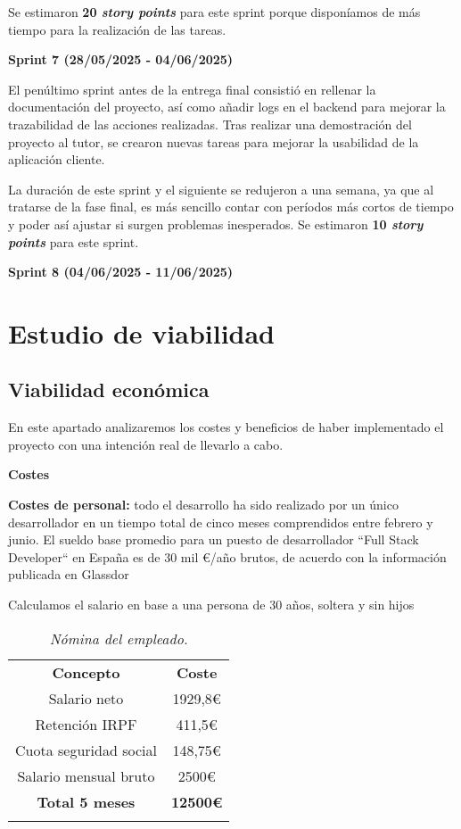 Se estimaron \textbf{20 \textit{story points}} para este sprint porque disponíamos de más tiempo para la realización de las
tareas.

\textbf{Sprint 7 (28/05/2025 - 04/06/2025)}

El penúltimo sprint antes de la entrega final consistió en rellenar la documentación del proyecto, así como añadir
logs en el backend para mejorar la trazabilidad de las acciones realizadas.
Tras realizar una demostración del proyecto al tutor, se crearon nuevas tareas para mejorar la usabilidad de la
aplicación cliente.

La duración de este sprint y el siguiente se redujeron a una semana, ya que al tratarse de la fase final, es más sencillo
contar con períodos más cortos de tiempo y poder así ajustar si surgen problemas inesperados.
Se estimaron \textbf{10 \textit{story points}} para este sprint.

\textbf{Sprint 8 (04/06/2025 - 11/06/2025)}

\section{Estudio de viabilidad}

\subsection{Viabilidad económica}

En este apartado analizaremos los costes y beneficios de haber implementado el proyecto con una intención real de llevarlo
a cabo.

\textbf{Costes}

\textbf{Costes de personal:} todo el desarrollo ha sido realizado por un único desarrollador en un tiempo total de cinco
meses comprendidos entre febrero y junio.
El sueldo base promedio para un puesto de desarrollador ``Full Stack Developer`` en España es de 30 mil €/año brutos, de acuerdo con
la información publicada en Glassdor\cite{glassdoorSueldo}


Calculamos el salario en base a una persona de 30 años, soltera y sin hijos\cite{seguridadSocial2025}

\begin{table}[H]
    \centering
    \begin{tabular}{| c | c |}
        \Xhline{2\arrayrulewidth}
        \textbf{Concepto} & \textbf{Coste} \\ \Xhline{2\arrayrulewidth}
        Salario neto & 1929,8€ \\ \hline
        Retención IRPF & 411,5€ \\ \hline
        Cuota seguridad social & 148,75€ \\ \hline
        Salario mensual bruto & 2500€ \\ \hline
        \Xhline{2\arrayrulewidth}
        \textbf{Total 5 meses} & \textbf{12500€} \\ \Xhline{2\arrayrulewidth}
    \end{tabular}
    \caption{\textit{Nómina del empleado.}}
\end{table}

